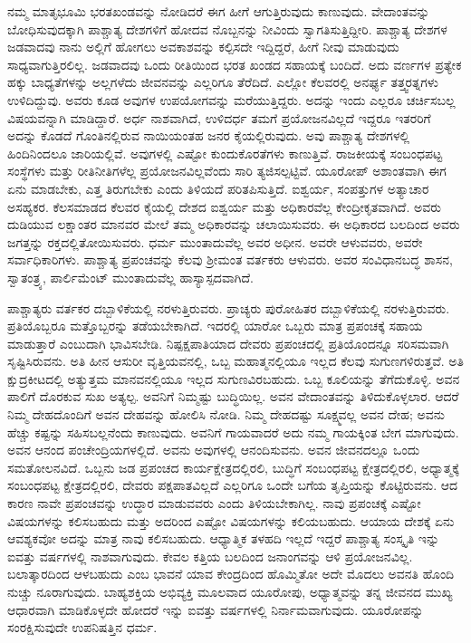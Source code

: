ನಮ್ಮ ಮಾತೃಭೂಮಿ ಭರತಖಂಡವನ್ನು ನೋಡಿದರೆ ಈಗ ಹೀಗೆ ಆಗುತ್ತಿರುವುದು ಕಾಣುವುದು. ವೇದಾಂತವನ್ನು ಬೋಧಿಸುವುದಕ್ಕಾಗಿ ಪಾಶ್ಚಾತ್ಯ ದೇಶಗಳಿಗೆ ಹೋದವ\- ನೊಬ್ಬನನ್ನು ನೀವಿಂದು ಸ್ವಾಗತಿಸುತ್ತಿದ್ದೀರಿ. ಪಾಶ್ಚಾತ್ಯ ದೇಶಗಳ ಜಡವಾದವು ನಾನು ಅಲ್ಲಿಗೆ ಹೋಗಲು ಅವಕಾಶವನ್ನು ಕಲ್ಪಿಸದೇ ಇದ್ದಿದ್ದರೆ, ಹೀಗೆ ನೀವು ಮಾಡುವುದು ಸಾಧ್ಯವಾಗುತ್ತಿರಲಿಲ್ಲ. ಜಡವಾದವು ಒಂದು ರೀತಿಯಿಂದ ಭರತ ಖಂಡದ ಸಹಾಯಕ್ಕೆ ಬಂದಿದೆ. ಅದು ವರ್ಣಗಳ ಪ್ರತ್ಯೇಕ ಹಕ್ಕು ಬಾಧ್ಯತೆಗಳನ್ನು ಅಲ್ಲಗಳೆದು ಜೀವನವನ್ನು ಎಲ್ಲರಿಗೂ ತೆರೆದಿದೆ. ಎಲ್ಲೋ ಕೆಲವರಲ್ಲಿ ಅನರ್ಘ್ಯ ತತ್ತ್ವರತ್ನಗಳು ಉಳಿದಿದ್ದುವು. ಅವರು ಕೂಡ ಅವುಗಳ ಉಪಯೋಗವನ್ನು ಮರೆಯುತ್ತಿದ್ದರು. ಅದನ್ನು ಇಂದು ಎಲ್ಲರೂ ಚರ್ಚಿಸಬಲ್ಲ ವಿಷಯವನ್ನಾಗಿ ಮಾಡಿದ್ದಾರೆ. ಅರ್ಧ ನಾಶವಾಗಿದೆ, ಉಳಿದರ್ಧ ತಮಗೆ ಪ್ರಯೋಜನವಿಲ್ಲದೆ ಇದ್ದರೂ ಇತರರಿಗೆ ಅದನ್ನು ಕೊಡದೆ ಗೊಂತಿನಲ್ಲಿರುವ ನಾಯಿಯಂತಹ ಜನರ ಕೈಯಲ್ಲಿರುವುದು. ಅವು ಪಾಶ್ಚಾತ್ಯ ದೇಶಗಳಲ್ಲಿ ಹಿಂದಿನಿಂದಲೂ ಜಾರಿಯಲ್ಲಿವೆ. ಅವುಗಳಲ್ಲಿ ಎಷ್ಟೋ ಕುಂದುಕೊರತೆಗಳು ಕಾಣುತ್ತಿವೆ. ರಾಜಕೀಯಕ್ಕೆ ಸಂಬಂಧಪಟ್ಟ ಸಂಸ್ಥೆಗಳು ಮತ್ತು ರೀತಿನೀತಿಗಳೆಲ್ಲ ಪ್ರಯೋಜನವಿಲ್ಲವೆಂದು ಸಾರಿ ತ್ಯಜಿಸಲ್ಪಟ್ಟಿವೆ. ಯೂರೋಪ್​ ಅಶಾಂತವಾಗಿ ಈಗ ಏನು ಮಾಡಬೇಕು, ಎತ್ತ ತಿರುಗಬೇಕು ಎಂದು ತಿಳಿಯದೆ ಪರಿತಪಿಸುತ್ತಿದೆ. ಐಶ್ವರ್ಯ, ಸಂಪತ್ತುಗಳ ಅತ್ಯಾಚಾರ ಅಸಹ್ಯಕರ. ಕೆಲಸಮಾಡದ ಕೆಲವರ ಕೈಯಲ್ಲಿ ದೇಶದ ಐಶ್ವರ್ಯ ಮತ್ತು ಅಧಿಕಾರವೆಲ್ಲ ಕೇಂದ್ರೀಕೃತವಾಗಿದೆ. ಅವರು ದುಡಿಯುವ ಲಕ್ಷಾಂತರ ಮಾನವರ ಮೇಲೆ ತಮ್ಮ ಅಧಿಕಾರವನ್ನು ಚಲಾಯಿಸುವರು. ಈ ಅಧಿಕಾರದ ಬಲದಿಂದ ಅವರು ಜಗತ್ತನ್ನು ರಕ್ತದಲ್ಲಿತೋಯಿಸುವರು. ಧರ್ಮ ಮುಂತಾದುವೆಲ್ಲ ಅವರ ಅಧೀನ. ಅವರೇ ಆಳುವವರು, ಅವರೇ ಸರ್ವಾಧಿಕಾರಿಗಳು. ಪಾಶ್ಚಾತ್ಯ ಪ್ರಪಂಚವನ್ನು ಕೆಲವು ಶ‍್ರೀಮಂತ ವರ್ತಕರು ಆಳುವರು. ಅವರ ಸಂವಿಧಾನಬದ್ಧ ಶಾಸನ, ಸ್ವಾತಂತ್ರ್ಯ, ಪಾರ್ಲಿಮೆಂಟ್​ ಮುಂತಾದುವೆಲ್ಲ ಹಾಸ್ಯಾಸ್ಪದವಾಗಿದೆ.

ಪಾಶ್ಚಾತ್ಯರು ವರ್ತಕರ ದಬ್ಬಾಳಿಕೆಯಲ್ಲಿ ನರಳುತ್ತಿರುವರು. ಪ್ರಾಚ್ಯರು ಪುರೋಹಿತರ ದಬ್ಬಾಳಿಕೆಯಲ್ಲಿ ನರಳುತ್ತಿರುವರು. ಪ್ರತಿಯೊಬ್ಬರೂ ಮತ್ತೊಬ್ಬರನ್ನು ತಡೆಯಬೇಕಾಗಿದೆ. ಇದರಲ್ಲಿ ಯಾರೋ ಒಬ್ಬರು ಮಾತ್ರ ಪ್ರಪಂಚಕ್ಕೆ ಸಹಾಯ ಮಾಡುತ್ತಾರೆ ಎಂಬುದಾಗಿ ಭಾವಿಸಬೇಡಿ. ನಿಷ್ಪಕ್ಷಪಾತಿಯಾದ ದೇವರು ಪ್ರಪಂಚದಲ್ಲಿ ಪ್ರತಿಯೊಂದನ್ನೂ ಸರಿಸಮವಾಗಿ ಸೃಷ್ಟಿಸಿರುವನು. ಅತಿ ಹೀನ ಆಸುರೀ ವೃತ್ತಿಯವನಲ್ಲಿ, ಒಬ್ಬ ಮಹಾತ್ಮ\-ನಲ್ಲಿಯೂ ಇಲ್ಲದ ಕೆಲವು ಸುಗುಣಗಳಿರುತ್ತವೆ. ಅತಿ ಕ್ಷುದ್ರಕೀಟದಲ್ಲಿ ಅತ್ಯುತ್ತಮ ಮಾನವನಲ್ಲಿಯೂ ಇಲ್ಲದ ಸುಗುಣವಿರಬಹುದು. ಒಬ್ಬ ಕೂಲಿಯನ್ನು ತೆಗೆದುಕೊಳ್ಳಿ. ಅವನ ಪಾಲಿಗೆ ದೊರಕುವ ಸುಖ ಅತ್ಯಲ್ಪ. ಅವನಿಗೆ ನಿಮ್ಮಷ್ಟು ಬುದ್ಧಿಯಿಲ್ಲ. ಅವನ ವೇದಾಂತವನ್ನು ತಿಳಿದುಕೊಳ್ಳಲಾರ. ಆದರೆ ನಿಮ್ಮ ದೇಹದೊಂದಿಗೆ ಅವನ ದೇಹವನ್ನು ಹೋಲಿಸಿ ನೋಡಿ. ನಿಮ್ಮ ದೇಹದಷ್ಟು ಸೂಕ್ಷ್ಮವಲ್ಲ ಅವನ ದೇಹ; ಅವನು ಹೆಚ್ಚು ಕಷ್ಟನ್ನು ಸಹಿಸಬಲ್ಲನೆಂದು ಕಾಣುವುದು. ಅವನಿಗೆ ಗಾಯವಾದರೆ ಅದು ನಮ್ಮ ಗಾಯಕ್ಕಿಂತ ಬೇಗ ಮಾಗುವುದು. ಅವನ ಆನಂದ ಪಂಚೇಂದ್ರಿಯಗಳಲ್ಲಿದೆ. ಅವನು ಅವುಗಳಲ್ಲಿ ಆನಂದಿಸುವನು. ಅವನ ಜೀವನದಲ್ಲೂ ಒಂದು ಸಮತೋಲನವಿದೆ. ಒಬ್ಬನು ಜಡ ಪ್ರಪಂಚದ ಕಾರ್ಯಕ್ಷೇತ್ರದಲ್ಲಿರಲಿ, ಬುದ್ಧಿಗೆ ಸಂಬಂಧಪಟ್ಟ ಕ್ಷೇತ್ರದಲ್ಲಿರಲಿ, ಅಧ್ಯಾತ್ಮಕ್ಕೆ ಸಂಬಂಧಪಟ್ಟ ಕ್ಷೇತ್ರದಲ್ಲಿರಲಿ, ದೇವರು ಪಕ್ಷಪಾತವಿಲ್ಲದೆ ಎಲ್ಲರಿಗೂ ಒಂದೇ ಬಗೆಯ ತೃಪ್ತಿಯನ್ನು ಕೊಟ್ಟಿರುವನು. ಆದ ಕಾರಣ ನಾವೇ ಪ್ರಪಂಚವನ್ನು ಉದ್ಧಾರ ಮಾಡುವವರು ಎಂದು ತಿಳಿಯಬೇಕಾಗಿಲ್ಲ. ನಾವು ಪ್ರಪಂಚಕ್ಕೆ ಎಷ್ಟೋ ವಿಷಯಗಳನ್ನು ಕಲಿಸಬಹುದು ಮತ್ತು ಅದರಿಂದ ಎಷ್ಟೋ ವಿಷಯಗಳನ್ನು ಕಲಿಯಬಹುದು. ಆಯಾಯ ದೇಶಕ್ಕೆ ಏನು ಆವಶ್ಯಕವೋ ಅದನ್ನು ಮಾತ್ರ ನಾವು ಕಲಿಸಬಹುದು. ಆಧ್ಯಾತ್ಮಿಕ ತಳಹದಿ ಇಲ್ಲದೆ ಇದ್ದರೆ ಪಾಶ್ಚಾತ್ಯ ಸಂಸ್ಕೃತಿ ಇನ್ನು ಐವತ್ತು ವರ್ಷಗಳಲ್ಲಿ ನಾಶವಾಗುವುದು. ಕೇವಲ ಕತ್ತಿಯ ಬಲದಿಂದ ಜನಾಂಗವನ್ನು ಆಳಿ ಪ್ರಯೋಜನವಿಲ್ಲ. ಬಲಾತ್ಕಾರದಿಂದ ಆಳಬಹುದು ಎಂಬ ಭಾವನೆ ಯಾವ ಕೇಂದ್ರದಿಂದ ಹೊಮ್ಮಿತೋ ಅದೇ ಮೊದಲು ಅವನತಿ ಹೊಂದಿ ನುಚ್ಚು ನೂರಾಗುವುದು. ಬಾಹ್ಯಶಕ್ತಿಯ ಅಭಿವ್ಯಕ್ತಿ ಮೂಲವಾದ ಯೂರೋಪು, ಅಧ್ಯಾತ್ಮವನ್ನು ತನ್ನ ಜೀವನದ ಮುಖ್ಯ ಆಧಾರವಾಗಿ ಮಾಡಿಕೊಳ್ಳದೇ ಹೋದರೆ ಇನ್ನು ಐವತ್ತು ವರ್ಷಗಳಲ್ಲಿ ನಿರ್ನಾಮವಾಗುವುದು. ಯೂರೋಪನ್ನು ಸಂರಕ್ಷಿಸುವುದೇ ಉಪನಿಷತ್ತಿನ ಧರ್ಮ.

